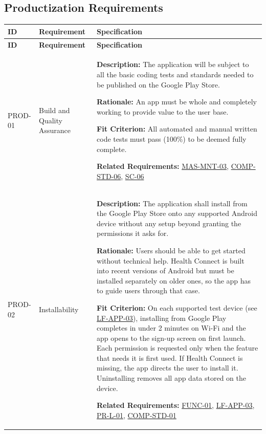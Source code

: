 \documentclass[12pt]{article}
\begin{document}
\subsection{Productization Requirements}
\small
\setlength{\tabcolsep}{4pt}
\begin{xltabular}{\textwidth}{|p{2.6cm}|p{3.4cm}|X|}
\hline
\textbf{ID} & \textbf{Requirement} & \textbf{Specification} \\
\hline
\endfirsthead
\hline
\textbf{ID} & \textbf{Requirement} & \textbf{Specification} \\
\hline
\endhead

PROD-01\hypertarget{req:PROD-01}{} &
Build and Quality Assurance & 
\textbf{Description:} The application will be subject to all the basic coding tests and standards needed to be published on the Google Play Store.

\textbf{Rationale:} An app must be whole and completely working to provide value to the user base.

\textbf{Fit Criterion:} All automated and manual written code tests must pass (100\%) to be deemed fully complete.

\textbf{Related Requirements:} \hyperlink{req:MAS-MNT-03}{MAS-MNT-03}, \hyperlink{req:COMP-STD-06}{COMP-STD-06}, \hyperlink{req:SC-06}{SC-06}\\
\hline

PROD-02\hypertarget{req:PROD-02}{} &
Installability &
\textbf{Description:} The application shall install from the Google Play Store onto any supported Android device without any setup beyond granting the permissions it asks for.

\textbf{Rationale:} Users should be able to get started without technical help. Health Connect is built into recent versions of Android but must be installed separately on older ones, so the app has to guide users through that case.

\textbf{Fit Criterion:} On each supported test device (see \hyperlink{req:LF-APP-03}{LF-APP-03}), installing from Google Play completes in under 2 minutes on Wi-Fi and the app opens to the sign-up screen on first launch. Each permission is requested only when the feature that needs it is first used. If Health Connect is missing, the app directs the user to install it. Uninstalling removes all app data stored on the device.

\textbf{Related Requirements:} \hyperlink{req:FUNC-01}{FUNC-01}, \hyperlink{req:LF-APP-03}{LF-APP-03}, \hyperlink{req:PR-L-01}{PR-L-01}, \hyperlink{req:COMP-STD-01}{COMP-STD-01}\\
\hline
\end{xltabular}
\end{document}
